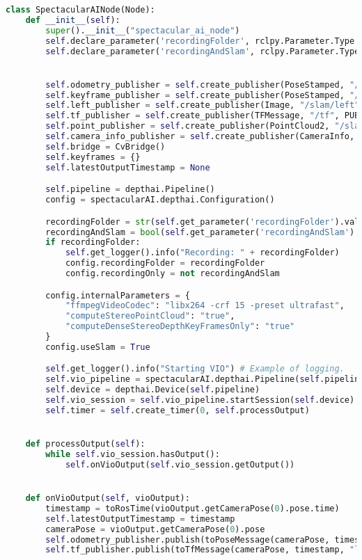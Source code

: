 \begin{lstlisting}[language=python,frame=single]
class SpectacularAINode(Node):
    def __init__(self):
        super().__init__("spectacular_ai_node")
        self.declare_parameter('recordingFolder', rclpy.Parameter.Type.STRING)
        self.declare_parameter('recordingAndSlam', rclpy.Parameter.Type.BOOL)


        self.odometry_publisher = self.create_publisher(PoseStamped, "/slam/odometry", PUBLISHER_QUEUE_SIZE)
        self.keyframe_publisher = self.create_publisher(PoseStamped, "/slam/keyframe", PUBLISHER_QUEUE_SIZE)
        self.left_publisher = self.create_publisher(Image, "/slam/left", PUBLISHER_QUEUE_SIZE)
        self.tf_publisher = self.create_publisher(TFMessage, "/tf", PUBLISHER_QUEUE_SIZE)
        self.point_publisher = self.create_publisher(PointCloud2, "/slam/pointcloud", PUBLISHER_QUEUE_SIZE)
        self.camera_info_publisher = self.create_publisher(CameraInfo, "/slam/camera_info", PUBLISHER_QUEUE_SIZE)
        self.bridge = CvBridge()
        self.keyframes = {}
        self.latestOutputTimestamp = None

        self.pipeline = depthai.Pipeline()
        config = spectacularAI.depthai.Configuration()

        recordingFolder = str(self.get_parameter('recordingFolder').value)
        recordingAndSlam = bool(self.get_parameter('recordingAndSlam').value)
        if recordingFolder:
            self.get_logger().info("Recording: " + recordingFolder)
            config.recordingFolder = recordingFolder
            config.recordingOnly = not recordingAndSlam

        config.internalParameters = {
            "ffmpegVideoCodec": "libx264 -crf 15 -preset ultrafast",
            "computeStereoPointCloud": "true",
            "computeDenseStereoDepthKeyFramesOnly": "true"
        }
        config.useSlam = True

        self.get_logger().info("Starting VIO") # Example of logging.
        self.vio_pipeline = spectacularAI.depthai.Pipeline(self.pipeline, config, self.onMappingOutput)
        self.device = depthai.Device(self.pipeline)
        self.vio_session = self.vio_pipeline.startSession(self.device)
        self.timer = self.create_timer(0, self.processOutput)


    def processOutput(self):
        while self.vio_session.hasOutput():
            self.onVioOutput(self.vio_session.getOutput())


    def onVioOutput(self, vioOutput):
        timestamp = toRosTime(vioOutput.getCameraPose(0).pose.time)
        self.latestOutputTimestamp = timestamp
        cameraPose = vioOutput.getCameraPose(0).pose
        self.odometry_publisher.publish(toPoseMessage(cameraPose, timestamp))
        self.tf_publisher.publish(toTfMessage(cameraPose, timestamp, "left_camera"))



\end{lstlisting}
